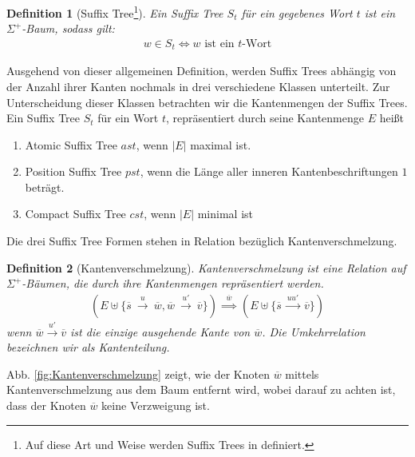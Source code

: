 \documentclass[12pt]{report}
\newtheorem{definition}{Definition}
\newcommand{\abs}[1]{\left|#1\right|}
\begin{document}
\begin{definition}[Suffix Tree\footnote{Auf diese Art und Weise werden Suffix Trees in \cite{Giegerich1995} definiert.}]
Ein Suffix Tree $S_t$ für ein gegebenes Wort $t$ ist ein $\Sigma^+$-Baum, sodass gilt:
\begin{gather*}
    w \in S_t \Longleftrightarrow w \text{ ist ein }t\text{-Wort}
\end{gather*}
\label{def:SuffixTree}
\end{definition}

Ausgehend von dieser allgemeinen Definition, werden Suffix Trees abhängig von der Anzahl ihrer Kanten nochmals in drei verschiedene Klassen unterteilt. Zur Unterscheidung dieser Klassen betrachten wir die Kantenmengen der Suffix Trees. Ein Suffix Tree $S_t$ für ein Wort $t$, repräsentiert durch seine Kantenmenge $E$ heißt
\begin{enumerate}
    \item Atomic Suffix Tree $ast$, wenn $\abs{E}$ maximal ist.
    \item Position Suffix Tree $pst$, wenn die Länge aller inneren Kantenbeschriftungen $1$ beträgt.
    \item Compact Suffix Tree $cst$, wenn $\abs{E}$ minimal ist
\end{enumerate}
Die drei Suffix Tree Formen stehen in Relation bezüglich Kantenverschmelzung.

\begin{definition}[Kantenverschmelzung]
Kantenverschmelzung ist eine Relation auf $\Sigma^+$-Bäumen, die durch ihre Kantenmengen repräsentiert werden.
\begin{gather*}
    \left(E \uplus \{\overline{s}\:\xrightarrow{u}\:\overline{w},\overline{w}\:\xrightarrow{u'}\:\overline{v}\}\right) \overset{\overline{w}}{\implies} \left(E \uplus \{\overline{s}\:\xrightarrow{uu'}\:\overline{v}\}\right)
\end{gather*}
wenn $\overline{w} \xrightarrow{u'} \overline{v}$ ist die einzige ausgehende Kante von $\overline{w}$. Die Umkehrrelation bezeichnen wir als Kantenteilung.
\end{definition}
Abb. \ref{fig:Kantenverschmelzung} zeigt, wie der Knoten $\overline{w}$ mittels Kantenverschmelzung aus dem Baum entfernt wird, wobei darauf zu achten ist, dass der Knoten $\overline{w}$ keine Verzweigung ist.
\end{document}
